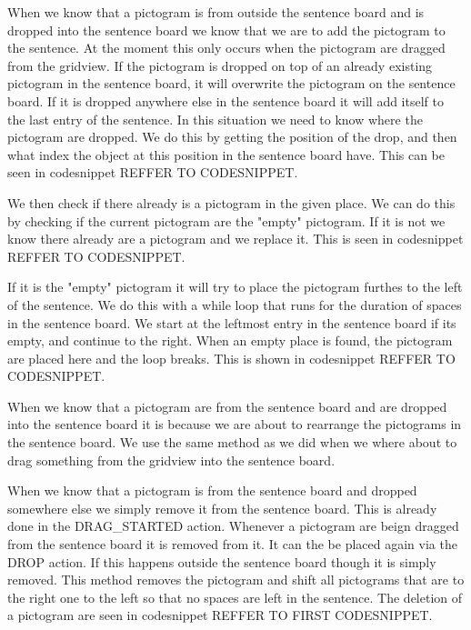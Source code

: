 When we know that a pictogram is from outside the sentence board and is dropped into the sentence board we know that we are to add the pictogram to the sentence. At the moment this only occurs when the pictogram are dragged from the gridview.
If the pictogram is dropped on top of an already existing pictogram in the sentence board, it will overwrite the pictogram on the sentence board. If it is dropped anywhere else in the sentence board it will add itself to the last entry of the sentence.
In this situation we need to know where the pictogram are dropped. 
We do this by getting the position of the drop, and then what index the object at this position in the sentence board have. 
This can be seen in codesnippet REFFER TO CODESNIPPET.


We then check if there already is a pictogram in the given place. We can do this by checking if the current pictogram are the "empty" pictogram. If it is not we know there already are a pictogram and we replace it.
This is seen in codesnippet REFFER TO CODESNIPPET.


If it is the "empty" pictogram it will try to place the pictogram furthes to the left of the sentence. 
We do this with a while loop that runs for the duration of spaces in the sentence board. We start at the leftmost entry in the sentence board if its empty, and continue to the right. 
When an empty place is found, the pictogram are placed here and the loop breaks.
This is shown in codesnippet REFFER TO CODESNIPPET.


When we know that a pictogram are from the sentence board and are dropped into the sentence board it is because we are about to rearrange the pictograms in the sentence board. We use the same method as we did when we where about to drag something from the gridview into the sentence board. 

When we know that a pictogram is from the sentence board and dropped somewhere else we simply remove it from the sentence board. This is already done in the DRAG_STARTED action. Whenever a pictogram are beign dragged from the sentence board it is removed from it. It can the be placed again via the DROP action. If this happens outside the sentence board though it is simply removed. 
This method removes the pictogram and shift all pictograms that are to the right one to the left so that no spaces are left in the sentence. 
The deletion of a pictogram are seen in codesnippet REFFER TO FIRST CODESNIPPET.


